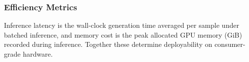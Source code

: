 \subsubsection{Efficiency Metrics}
Inference latency is the wall-clock generation time averaged per sample under
batched inference, and memory cost is the peak allocated GPU memory (GiB)
recorded during inference. Together these determine deployability on
consumer-grade hardware.

